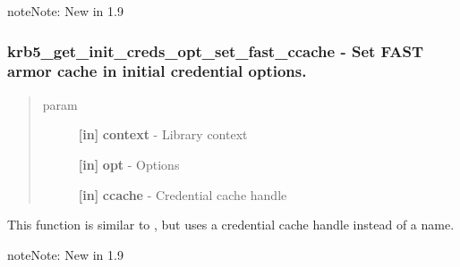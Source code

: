 \documentclass[letterpaper,10pt,english]{sphinxmanual}
\begin{document}
\begin{notice}{note}{Note:}
New in 1.9
\end{notice}


\subsubsection{krb5\_get\_init\_creds\_opt\_set\_fast\_ccache -  Set FAST armor cache in initial credential options.}
\label{appdev/refs/api/krb5_get_init_creds_opt_set_fast_ccache::doc}\label{appdev/refs/api/krb5_get_init_creds_opt_set_fast_ccache:krb5-get-init-creds-opt-set-fast-ccache-set-fast-armor-cache-in-initial-credential-options}

\begin{fulllineitems}
\label{appdev/refs/api/krb5_get_init_creds_opt_set_fast_ccache:c.krb5_get_init_creds_opt_set_fast_ccache}
\end{fulllineitems}

\begin{quote}\begin{description}
\item[{param}] \leavevmode
\textbf{{[}in{]}} \textbf{context} - Library context

\textbf{{[}in{]}} \textbf{opt} - Options

\textbf{{[}in{]}} \textbf{ccache} - Credential cache handle

\end{description}\end{quote}

This function is similar to {\hyperref[appdev/refs/api/krb5_get_init_creds_opt_set_fast_ccache_name:c.krb5_get_init_creds_opt_set_fast_ccache_name]{}} , but uses a credential cache handle instead of a name.

\begin{notice}{note}{Note:}
New in 1.9
\end{notice}
\end{document}
